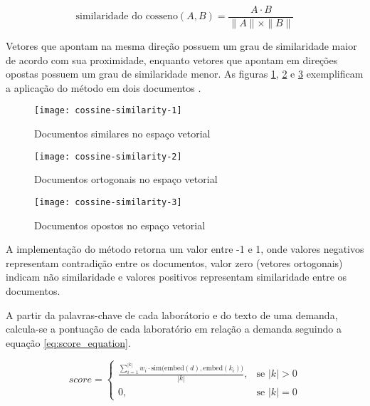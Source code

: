 \begin{equation}
    \label{eq:cossine_similarity_equation}
    \text{similaridade do cosseno}(A, B) = \frac{A \cdot B}{\|A\| \times \|B\|}
\end{equation}

Vetores que apontam na mesma direção possuem um grau de similaridade maior de acordo com sua proximidade, enquanto vetores que apontam em direções opostas possuem um grau de similaridade menor. As figuras \ref{fig:cossine_similarity_1}, \ref{fig:cossine_similarity_2} e \ref{fig:cossine_similarity_3} exemplificam a aplicação do método em dois documentos \cite{YlberArtan2022}.

\begin{figure}[H]
    \caption{Documentos similares no espaço vetorial}
    \texttt{[image: cossine-similarity-1]}
    \label{fig:cossine_similarity_1}
\end{figure}

\begin{figure}[H]
    \caption{Documentos ortogonais no espaço vetorial}
    \texttt{[image: cossine-similarity-2]}
    \label{fig:cossine_similarity_2}
\end{figure}

\begin{figure}[H]
    \caption{Documentos opostos no espaço vetorial}
    \texttt{[image: cossine-similarity-3]}
    \label{fig:cossine_similarity_3}
\end{figure}

A implementação do método retorna um valor entre -1 e 1, onde valores negativos representam contradição entre os documentos, valor zero (vetores ortogonais) indicam não similaridade e valores positivos representam similaridade entre os documentos.

A partir da palavras-chave de cada laborátorio e do texto de uma demanda, calcula-se a pontuação de cada laboratório em relação a demanda seguindo a equação \ref{eq:score_equation}.

\begin{equation}
    \label{eq:score_equation}
    score =
    \begin{cases}
        \frac{\sum_{i=1}^{|k|} w_i \cdot \text{sim}\big(\text{embed}(d), \text{embed}(k_i)\big)}{|k|}, & \text{se } |k| > 0 \\
        0,                                                                                             & \text{se } |k| = 0
    \end{cases}
\end{equation}


